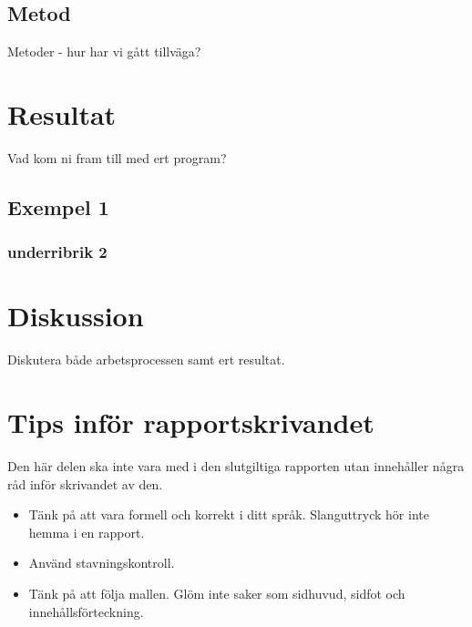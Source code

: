 \documentclass[a4paper]{article}
\begin{document}
\subsection{Metod}
Metoder - hur har vi gått tillväga? 



\newpage
\section{Resultat}
Vad kom ni fram till med ert program?

\subsection{Exempel 1}
\subsubsection{underribrik 2}



\newpage
\section{Diskussion}
Diskutera både arbetsprocessen samt ert resultat. 
\newpage
\appendix
\section{Tips inför rapportskrivandet}
Den här delen ska inte vara med i den slutgiltiga rapporten utan innehåller några råd inför skrivandet av den.

\begin{itemize}
	\item Tänk på att vara formell och korrekt i ditt språk. Slanguttryck hör inte hemma i en rapport.
	\item Använd stavningskontroll.
	\item Tänk på att följa mallen. Glöm inte saker som sidhuvud, sidfot och innehållsförteckning.
	
	
\end{itemize}
\end{document}

